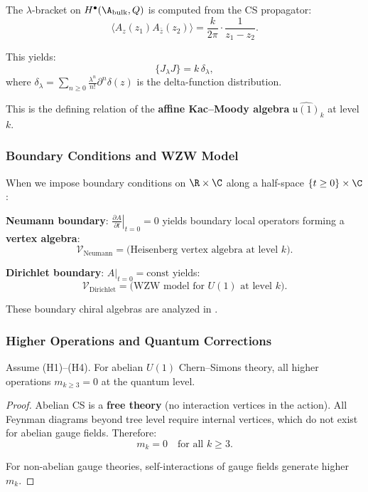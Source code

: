 The $\lambda$-bracket on $H^\bullet(\A_{\text{bulk}}, Q)$ is computed from the CS propagator:
\begin{equation}
\langle A_z(z_1) A_{\bar{z}}(z_2) \rangle = \frac{k}{2\pi} \cdot \frac{1}{z_1 - z_2}.
\end{equation}

This yields:
\begin{equation}
\{J_\lambda J\} = k \, \delta_\lambda,
\end{equation}
where $\delta_\lambda = \sum_{n \geq 0} \frac{\lambda^n}{n!} \partial^n \delta(z)$ is the delta-function distribution.

This is the defining relation of the \textbf{affine Kac--Moody algebra} $\widehat{\mathfrak{u}(1)}_k$ at level $k$.

\subsubsection{Boundary Conditions and WZW Model}

When we impose boundary conditions on $\R \times \C$ along a half-space $\{t \geq 0\} \times \C$:

\textbf{Neumann boundary}: $\left. \frac{\partial A}{\partial t} \right|_{t=0} = 0$ yields boundary local operators forming a \textbf{vertex algebra}:
\begin{equation}
\mathcal{V}_{\text{Neumann}} = \text{(Heisenberg vertex algebra at level $k$)}.
\end{equation}

\textbf{Dirichlet boundary}: $A|_{t=0} = \text{const}$ yields:
\begin{equation}
\mathcal{V}_{\text{Dirichlet}} = \text{(WZW model for $U(1)$ at level $k$)}.
\end{equation}

These boundary chiral algebras are analyzed in \cite{CDG20}.

\subsubsection{Higher Operations and Quantum Corrections}

\begin{proposition}
Assume \textrm{(H1)--(H4)}.
For abelian $U(1)$ Chern--Simons theory, all higher operations $m_{k \geq 3} = 0$ at the quantum level.
\end{proposition}

\begin{proof}
Abelian CS is a \textbf{free theory} (no interaction vertices in the action). All Feynman diagrams beyond tree level require internal vertices, which do not exist for abelian gauge fields. Therefore:
\begin{equation}
m_k = 0 \quad \text{for all } k \geq 3.
\end{equation}

For non-abelian gauge theories, self-interactions of gauge fields generate higher $m_k$.
\end{proof}

